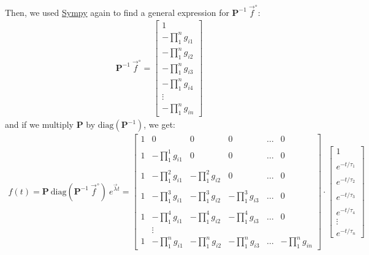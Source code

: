 \documentclass{article}
\newcommand{\finit}{\vec{f}^\circ}
\begin{document}
Then, we used \href{https://www.sympy.org/}{Sympy} again to find a general expression for $\mathbf{P}^{-1} ~\finit$:
\begin{eqnarray}
    \mathbf{P}^{-1} ~\finit = 
    \begin{bmatrix}
        1 \\
        -\prod_1^n g_{i1} \\
        -\prod_1^n g_{i2} \\
        -\prod_1^n g_{i3} \\
        -\prod_1^n g_{i4} \\
        \vdots \\
        -\prod_1^n g_{in}
    \end{bmatrix}
\end{eqnarray}
and if we multiply $\mathbf{P}$ by $\text{diag}\left(\mathbf{P}^{-1}\right)$, we get:
\begin{eqnarray}
    f(t) =
    \mathbf{P}~\text{diag}\left(\mathbf{P}^{-1} ~\finit\right)~e^{\vec{\lambda}t} =
    \begin{bmatrix}
        1 & 0 & 0 & 0 & \ldots & 0 \\ \\
        1 & -\prod_1^1 g_{i1} & 0 & 0 & \ldots & 0 \\ \\
        1 & -\prod_1^2 g_{i1} & -\prod_1^2 g_{i2} & 0 & \ldots & 0 \\ \\
        1 & -\prod_1^3 g_{i1} & -\prod_1^3 g_{i2} & -\prod_1^3 g_{i3} & \ldots & 0 \\ \\
        1 & -\prod_1^4 g_{i1} & -\prod_1^4 g_{i2} & -\prod_1^4 g_{i3} & \ldots & 0 \\         & \vdots & & & & \\
        1 & -\prod_1^n g_{i1} & -\prod_1^n g_{i2} & -\prod_1^n g_{i3} &\ldots & -\prod_1^n g_{in}
    \end{bmatrix}
    \cdot
    \begin{bmatrix}
       1 \\ \\
       e^{-t/\tau_1} \\ \\
       e^{-t/\tau_2} \\ \\
       e^{-t/\tau_3} \\ \\
       e^{-t/\tau_4} \\
       \vdots \\
       e^{-t/\tau_n}
    \end{bmatrix}
\end{eqnarray}
\end{document}
